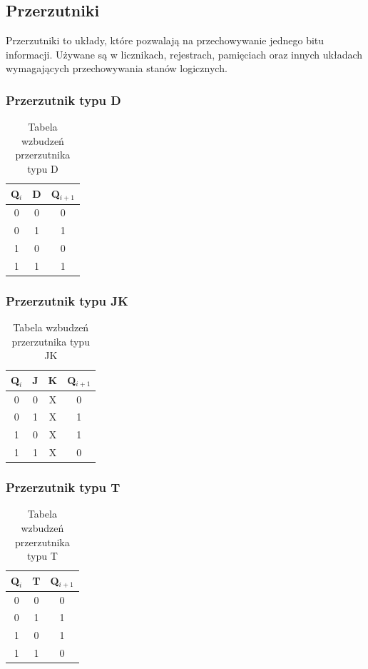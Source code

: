 \documentclass{article}
\begin{document}
	\pagebreak
	
    \subsection{ Przerzutniki}

    Przerzutniki to układy, które pozwalają na przechowywanie jednego bitu informacji. Używane są w licznikach, rejestrach, pamięciach oraz innych układach wymagających przechowywania stanów logicznych.

    \subsubsection{Przerzutnik typu D}
    \begin{table}[H]
    	\centering
    	\begin{tabular}{|c|c|c|}
    		\hline
    		\textbf{Q$_i$} & \textbf{D} & \textbf{Q$_{i+1}$} \\ \hline
    		0 & 0 & 0 \\ 
    		0 & 1 & 1 \\ 
    		1 & 0 & 0 \\ 
    		1 & 1 & 1 \\ 
    		\hline
    	\end{tabular}
    	\caption{Tabela wzbudzeń przerzutnika typu D}
    \end{table}
    
    \subsubsection{Przerzutnik typu JK}
    \begin{table}[H]
    	\centering
    	\begin{tabular}{|c|c|c|c|}
    		\hline
    		\textbf{Q$_i$} & \textbf{J} & \textbf{K} & \textbf{Q$_{i+1}$} \\ \hline
    		0 & 0 & X & 0 \\ 
    		0 & 1 & X & 1 \\ 
    		1 & 0 & X & 1 \\ 
    		1 & 1 & X & 0 \\ 
    		\hline
    	\end{tabular}
    	\caption{Tabela wzbudzeń przerzutnika typu JK}
    \end{table}
    
    \subsubsection{Przerzutnik typu T}
    \begin{table}[H]
    	\centering
    	\begin{tabular}{|c|c|c|}
    		\hline
    		\textbf{Q$_i$} & \textbf{T} & \textbf{Q$_{i+1}$} \\ \hline
    		0 & 0 & 0 \\ 
    		0 & 1 & 1 \\ 
    		1 & 0 & 1 \\ 
    		1 & 1 & 0 \\ 
    		\hline
    	\end{tabular}
    	\caption{Tabela wzbudzeń przerzutnika typu T}
    \end{table}
    
\end{document}
